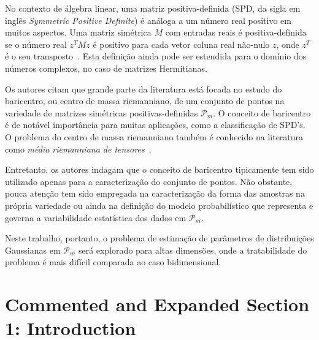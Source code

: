 \documentclass[a4paper,titlepage]{article}
\begin{document}
No contexto de álgebra linear, uma matriz positiva-definida (SPD, da sigla em
inglês \textit{Symmetric Positive Definite}) é análoga a um número real
positivo em muitos aspectos. Uma matriz simétrica $M$ com entradas reais é
positiva-definida se o número real $z^T M z$ é positivo para cada vetor coluna
real não-nulo $z$, onde $z^T$ é o seu
transposto~\cite{doi:PositiveDefiniteMatrices}.  Esta definição ainda pode ser
estendida para o domínio dos números complexos, no caso de matrizes
Hermitianas.

Os autores citam que grande parte da literatura está focada no estudo do
baricentro, ou centro de massa riemanniano, de um conjunto de pontos na
variedade de matrizes simétricas positivas-definidas $\mathcal{P}_m$.  O
conceito de baricentro é de notável importância para muitas aplicações, como a
classificação de SPD's. O problema do centro de massa riemanniano também é
conhecido na literatura como \textit{média riemanniana de
tensores}~\cite{moakher2005differential}.

Entretanto, os autores indagam que o conceito de baricentro tipicamente tem
sido utilizado apenas para a caracterização do conjunto de pontos. Não
obstante, pouca atenção tem sido empregada na caracterização da forma das
amostras na própria variedade ou ainda na definição do modelo probabilístico
que representa e governa a variabilidade estatística dos dados em
$\mathcal{P}_m$.

Neste trabalho, portanto, o problema de estimação de parâmetros de
distribuições Gaussianas em $\mathcal{P}_m$ será explorado para altas
dimensões, onde a tratabilidade do problema é mais difícil comparada ao caso
bidimensional.

\section{Commented and Expanded Section 1: Introduction}
\end{document}
